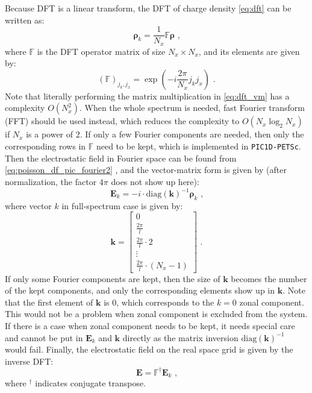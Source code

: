 \documentclass[12pt]{article}
\let\orgautoref\autoref
\renewcommand{\autoref}[1]
{%
    \def\equationautorefname{Eq.}%
    \def\figureautorefname{Fig.}%
    \def\subfigureautorefname{Fig.}%
    \def\sectionautorefname{Sec.}%
    \def\subsubsectionautorefname{Sec.}%
    \orgautoref{#1}%
}
\begin{document}
Because DFT is a linear transform, the DFT of charge density \autoref{eq:dft} can be written as:
\begin{equation}
	\boldsymbol{\rho}_k = \frac{1}{N_x} \mathbb{F} \boldsymbol{\rho} \textrm{ ,} \label{eq:dft_vm}
\end{equation}
where $\mathbb{F}$ is the DFT operator matrix of size $N_x \times N_x$, and its elements are given by:
\begin{equation}
	(\mathbb{F})_{j_k,j_x} = \exp \left( -i \frac{2 \pi}{N_x} j_k j_x \right) \textrm{ .}
\end{equation}
Note that literally performing the matrix multiplication in \autoref{eq:dft_vm} has a complexity $O(N_x^2)$.
When the whole spectrum is needed, fast Fourier transform (FFT) should be used instead, which reduces the complexity to $O(N_x \log_2 N_x)$ if $N_x$ is a power of $2$.
If only a few Fourier components are needed, then only the corresponding rows in $\mathbb{F}$ need to be kept, which is implemented in \texttt{PIC1D-PETSc}.
Then the electrostatic field in Fourier space can be found from \autoref{eq:poisson_df_pic_fourier2}, and the vector-matrix form is given by (after normalization, the factor $4 \pi$ does not show up here):
\begin{equation}
	\boldsymbol{E}_k = -i \cdot \mathrm{diag}(\boldsymbol{k})^{-1} \boldsymbol{\rho}_k \textrm{ ,} \label{eq:poisson_df_pic_fourier2_vm}
\end{equation}
where vector $k$ in full-spectrum case is given by:
\begin{equation}
	\boldsymbol{k} = \left[ \begin{array}{c}
		0 \\
		\frac{2 \pi}{l} \\
		\frac{2 \pi}{l} \cdot 2 \\
		\vdots \\
		\frac{2 \pi}{l} \cdot (N_x - 1)
	\end{array} \right] \textrm{ .}
\end{equation}
If only some Fourier components are kept, then the size of $\boldsymbol{k}$ becomes the number of the kept components, and only the corresponding elements show up in $\boldsymbol{k}$.
Note that the first element of $\boldsymbol{k}$ is 0, which corresponds to the $k = 0$ zonal component.
This would not be a problem when zonal component is excluded from the system.
If there is a case when zonal component needs to be kept, it needs special care and cannot be put in $\boldsymbol{E}_k$ and $\boldsymbol{k}$ directly as the matrix inversion $\mathrm{diag}(\boldsymbol{k})^{-1}$ would fail. Finally, the electrostatic field on the real space grid is given by the inverse DFT:
\begin{equation}
	\boldsymbol{E} = \mathbb{F}^\dagger \boldsymbol{E}_k \textrm{ ,}
\end{equation}
where $^\dagger$ indicates conjugate transpose.
\end{document}
